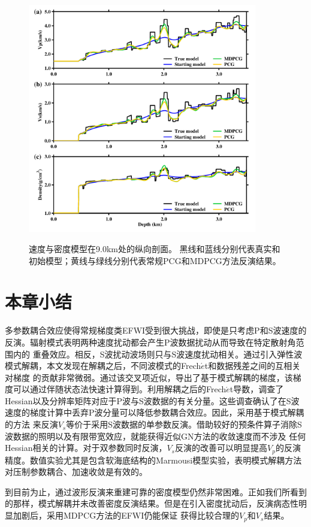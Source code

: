 \begin{figure}
    \begin{center}
        {\includegraphics[width=10cm]{Figure/chapter02/tariqsugresult/Fig/9kmrho.pdf}}
        \caption{
			速度与密度模型在9.0km处的纵向剖面。
			黑线和蓝线分别代表真实和初始模型；黄线与绿线分别代表常规PCG和MDPCG方法反演结果。
    }
    \label{fig:RhoProfile9km}
    \end{center}
\end{figure} 

\section{本章小结}
多参数耦合效应使得常规梯度类EFWI受到很大挑战，即使是只考虑P和S波速度的反演。辐射模式表明两种速度扰动都会产生P波数据扰动从而导致在特定散射角范围内的
重叠效应。相反，S波扰动波场则只与S波速度扰动相关。通过引入弹性波模式解耦，本文发现在解耦之后，不同波模式的Frech{$\acute{e}$}t和数据残差之间的互相关对梯度
的贡献非常微弱。通过该交叉项近似，导出了基于模式解耦的梯度，该梯度可以通过伴随状态法快速计算得到。利用解耦之后的Frech{$\acute{e}$}t导数，调查了
Hessian以及分辨率矩阵对应于P波与S波数据的有关分量。这些调查确认了在S波速度的梯度计算中丢弃P波分量可以降低参数耦合效应。因此，采用基于模式解耦的方法
来反演$V_s$等价于采用S波数据的单参数反演。借助较好的预条件算子消除S波数据的照明以及有限带宽效应，就能获得近似GN方法的收敛速度而不涉及
任何Hessian相关的计算。对于双参数同时反演，$V_s$反演的改善可以明显提高$V_p$的反演精度。数值实验尤其是包含软海底结构的Marmousi模型实验，表明模式解耦方法
对压制参数耦合、加速收敛是有效的。

到目前为止，通过波形反演来重建可靠的密度模型仍然非常困难。正如我们所看到的那样，模式解耦并未改善密度反演结果。但是在引入密度扰动后，反演病态性明显加剧后，采用MDPCG方法的EFWI仍能保证
获得比较合理的$V_p$和$V_s$结果。
